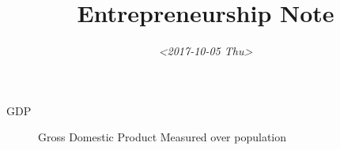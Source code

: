 \documentclass[11pt]{article}
\date{\textit{<2017-10-05 Thu>}}
\title{Entrepreneurship Note}
\begin{document}
\maketitle
\tableofcontents

\begin{description}
\item[{GDP}] Gross Domestic Product
Measured over population
\end{description}
\end{document}
